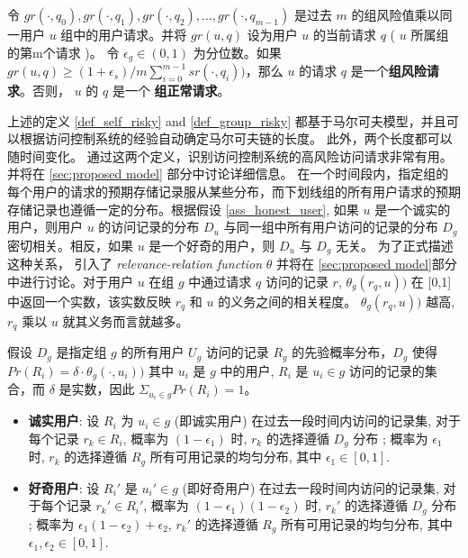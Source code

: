 \begin{definition}%
	\label{def_group_risky}
	令 $gr(\cdot, q_0), gr(\cdot, q_1), gr(\cdot, q_2), ... , gr(\cdot, q_{m-1})$ 是过去 $m$ 的组风险值乘以同一用户 $u$ 组中的用户请求。并将 $gr(u,q)$ 设为用户 $u$ 的当前请求 $q$  ( $u$ 所属组的第m个请求 )。 令 $\epsilon_g \in (0,1)$ 为分位数。如果$gr(u,q) \geq  (1+\epsilon_s) / m  \sum ^{m-1}_{i=0}{sr(\cdot,q_i))}$，那么 $u$ 的请求 $q$ 是一个\textbf{组风险请求}。否则， $u$ 的 $q$ 是一个 \textbf{组正常请求}。
\end{definition}

%
%
上述的定义 \ref{def_self_risky} and \ref{def_group_risky} 都基于马尔可夫模型，并且可以根据访问控制系统的经验自动确定马尔可夫链的长度。 此外，两个长度都可以随时间变化。 通过这两个定义，识别访问控制系统的高风险访问请求非常有用。并将在 \ref{sec:proposed model} 部分中讨论详细信息。 在一个时间段内，指定组的每个用户的请求的预期存储记录服从某些分布，而下划线组的所有用户请求的预期存储记录也遵循一定的分布。根据假设 \ref{ass_honest_user}, 如果 $u$ 是一个诚实的用户，则用户 $u$ 的访问记录的分布 $D_u$ 与同一组中所有用户访问的记录的分布 $D_g$ 密切相关。相反，如果 $u$ 是一个好奇的用户，则 $D_u$ 与 $D_g$ 无关。 为了正式描述这种关系， 引入了 \emph{relevance-relation function} $\theta$ 并将在 \ref{sec:proposed model}部分中进行讨论。对于用户 $u$ 在组 $g$ 中通过请求 $q$ 访问的记录 $r$, $\theta_g (r_q,u))$ 在 [0,1] 中返回一个实数，该实数反映 $r_q$ 和 $u$ 的义务之间的相关程度。 $\theta_g (r_q,u))$ 越高, $r_q$ 乘以 $u$ 就其义务而言就越多。


\begin{definition}%
	\label{def_curious user}
	假设 $D_g$ 是指定组 $g$ 的所有用户 $U_g$ 访问的记录 $R_g$ 的先验概率分布，$D_g$ 使得 $Pr(R_i)=\delta \cdot \theta_g (\cdot,u_i))$ 其中 $u_i$ 是 $g$ 中的用户, $R_i$ 是 $u_i \in g$ 访问的记录的集合，而 $\delta$ 是实数，因此 $\Sigma_{u_i \in g}Pr(R_i) = 1$。
	\begin{itemize}
		\item \textbf{诚实用户}: 设 $R_i$ 为 $u_i \in g$ (即诚实用户) 在过去一段时间内访问的记录集, 对于每个记录 $r_k \in R_i$, 概率为 $(1-\epsilon_1)$ 时,  $r_k$ 的选择遵循 $D_g$ 分布 ; 概率为 $\epsilon_1$ 时,  $r_k$ 的选择遵循 $R_g$ 所有可用记录的均匀分布, 其中 $\epsilon_1 \in [0,1]$.
		\item \textbf{好奇用户}: 设 $R_i'$ 是 $u_i' \in g$ (即好奇用户) 在过去一段时间内访问的记录集, 对于每个记录 $r_k' \in R_i'$, 概率为 $(1-\epsilon_1)(1-\epsilon_2)$ 时,  $r_k'$ 的选择遵循 $D_g$ 分布 ; 概率为 $\epsilon_1 (1 - \epsilon_2)+ \epsilon_2$,  $r_k'$ 的选择遵循 $R_g$ 所有可用记录的均匀分布, 其中 $\epsilon_1, \epsilon_2 \in [0,1]$.
	\end{itemize}
\end{definition}

